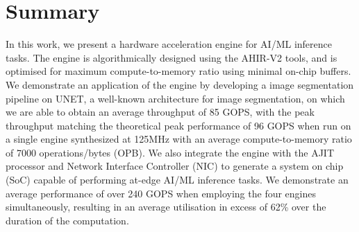 \documentclass[a4paper,12pt, final]{report}
\begin{document}

\chapter{Summary}

In this work, we present a hardware acceleration engine for AI/ML inference tasks. The engine is algorithmically designed using the AHIR-V2 tools, and is optimised for maximum compute-to-memory ratio using minimal on-chip buffers. We demonstrate an application of the engine by developing a image segmentation pipeline on UNET, a well-known architecture for image segmentation, on which we are able to obtain an average throughput of 85 GOPS, with the peak throughput matching the theoretical peak performance of 96 GOPS when run on a single engine synthesized at 125MHz with an average compute-to-memory ratio of 7000 operations/bytes (OPB). We also integrate the engine with the AJIT processor and Network Interface Controller (NIC) to generate a system on chip (SoC) capable of performing at-edge AI/ML inference tasks. We demonstrate an average performance of over 240 GOPS when employing the four engines simultaneously, resulting in an average utilisation in excess of 62\% over the duration of the computation.
\\
\end{document}

